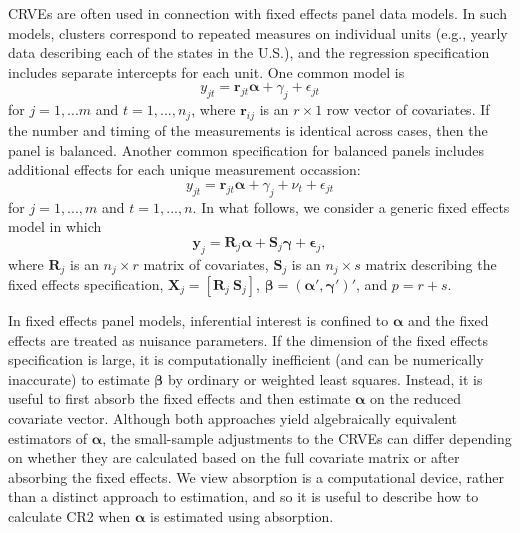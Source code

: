 \documentclass[12pt]{article}\usepackage[]{graphicx}\usepackage[]{color}
\newcommand{\bm}{\mathbf}
\newcommand{\bs}{\boldsymbol}
\begin{document}
CRVEs are often used in connection with fixed effects panel data models. 
In such models, clusters correspond to repeated measures on individual units (e.g., yearly data describing each of the states in the U.S.), and the regression specification includes separate intercepts for each unit.
One common model is 
\[
y_{jt} = \bm{r}_{jt} \bs\alpha + \gamma_j + \epsilon_{jt} \]
for $j=1,...m$ and $t = 1,...,n_j$, where $\bm{r}_{ij}$ is an $r \times 1$ row vector of covariates. If the number and timing of the measurements is identical across cases, then the panel is balanced. Another common specification for balanced panels includes additional effects for each unique measurement occassion:
\[
y_{jt} = \bm{r}_{jt} \bs\alpha + \gamma_j + \nu_t + \epsilon_{jt} \]
for $j=1,...,m$ and $t = 1,...,n$. 
In what follows, we consider a generic fixed effects model in which
\begin{equation}
\label{eq:fixed_effects}
\bm{y}_j = \bm{R}_j \bs\alpha + \bm{S}_j \bs\gamma + \bs\epsilon_j,
\end{equation}
where $\bm{R}_j$ is an $n_j \times r$ matrix of covariates, $\bm{S}_j$ is an $n_j \times s$ matrix describing the fixed effects specification, $\bm{X}_j = \left[\bm{R}_j \ \bm{S}_j\right]$, $\bs\beta = \left(\bs\alpha', \bs\gamma'\right)'$, and $p = r + s$. 

In fixed effects panel models, inferential interest is confined to $\bs\alpha$ and the fixed effects are treated as nuisance parameters. 
If the dimension of the fixed effects specification is large, it is computationally inefficient (and can be numerically inaccurate) to estimate $\bs\beta$ by ordinary or weighted least squares. 
Instead, it is useful to first absorb the fixed effects and then estimate $\bs\alpha$ on the reduced covariate vector.
Although both approaches yield algebraically equivalent estimators of $\bs\alpha$, the small-sample adjustments to the CRVEs can differ depending on whether they are calculated based on the full covariate matrix or after absorbing the fixed effects. 
We view absorption is a computational device, rather than a distinct approach to estimation, and so it is useful to describe how to calculate CR2 when $\bs\alpha$ is estimated using absorption.
\end{document}

